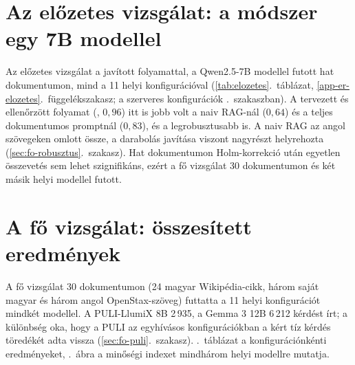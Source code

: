 \section{Az előzetes vizsgálat: a módszer egy 7B modellel}
\label{sec:elozetes}

Az előzetes vizsgálat a javított folyamattal, a Qwen2.5-7B modellel futott hat dokumentumon, mind a 11 helyi
konfigurációval (\ref{tab:elozetes}.~táblázat, \ref{app-er-elozetes}.~függelékszakasz; a szerveres
konfigurációk \az{\ref{sec:modellek-szerver}}.~szakaszban). A tervezett és ellenőrzött folyamat (,
$0{,}96$) itt is jobb volt a naiv RAG-nál ($0{,}64$) és a teljes dokumentumos promptnál ($0{,}83$), és a
legrobusztusabb is. A naiv RAG az angol szövegeken omlott össze, a darabolás javítása viszont nagyrészt helyrehozta
(\ref{sec:fo-robusztus}.~szakasz). Hat dokumentumon Holm-korrekció után egyetlen összevetés sem lehet
szignifikáns, ezért a fő vizsgálat 30 dokumentumon és két másik helyi modellel futott.

\section{A fő vizsgálat: összesített eredmények}
\label{sec:fo-vizsgalat}

A fő vizsgálat 30 dokumentumon (24 magyar Wikipédia-cikk, három saját magyar és három angol OpenStax-szöveg)
futtatta a 11 helyi konfigurációt mindkét modellel. A PULI-LlumiX 8B 2\,935, a Gemma 3 12B 6\,212 kérdést
írt; a különbség oka, hogy a PULI az egyhívásos konfigurációkban a kért tíz kérdés töredékét adta vissza
(\ref{sec:fo-puli}.~szakasz). \Az{\ref{tab:fo}}.~táblázat a konfigurációnkénti eredményeket,
\az{\ref{fig:rangsor}}.~ábra a minőségi indexet mindhárom helyi modellre mutatja.

